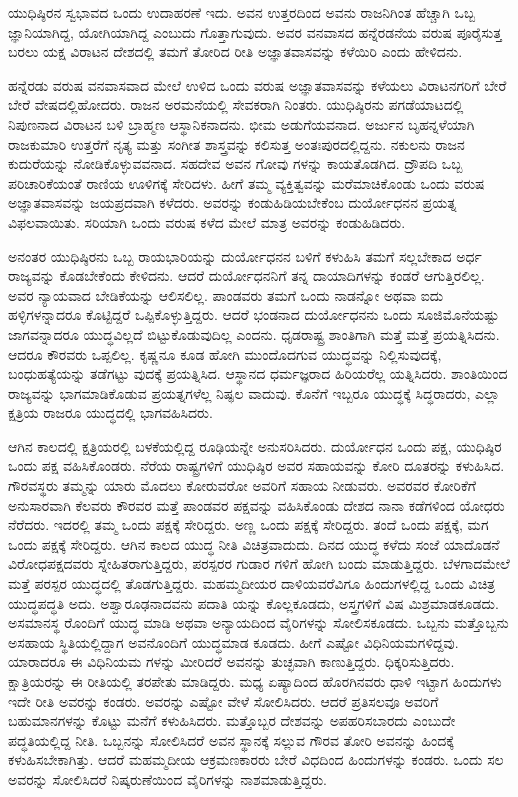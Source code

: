 ಯುಧಿಷ್ಠಿರನ ಸ್ವಭಾವದ ಒಂದು ಉದಾಹರಣೆ ಇದು. ಅವನ ಉತ್ತರದಿಂದ ಅವನು ರಾಜನಿಗಿಂತ ಹೆಚ್ಚಾಗಿ ಒಬ್ಬ ಜ್ಞಾನಿಯಾಗಿದ್ದ, ಯೋಗಿಯಾಗಿದ್ದ ಎಂಬುದು ಗೊತ್ತಾಗುವುದು. ಅವರ ವನವಾಸದ ಹನ್ನೆರಡನೆಯ ವರುಷ ಪೂರೈಸುತ್ತ ಬರಲು ಯಕ್ಷ ವಿರಾಟನ ದೇಶದಲ್ಲಿ ತಮಗೆ ತೋರಿದ ರೀತಿ ಅಜ್ಞಾತವಾಸವನ್ನು ಕಳೆಯಿರಿ ಎಂದು ಹೇಳಿದನು.

ಹನ್ನೆರಡು ವರುಷ ವನವಾಸವಾದ ಮೇಲೆ ಉಳಿದ ಒಂದು ವರುಷ ಅಜ್ಞಾತವಾಸವನ್ನು ಕಳೆಯಲು ವಿರಾಟನಗರಿಗೆ ಬೇರೆ ಬೇರೆ ವೇಷದಲ್ಲಿಹೋದರು. ರಾಜನ ಅರಮನೆಯಲ್ಲಿ ಸೇವಕರಾಗಿ ನಿಂತರು. ಯುಧಿಷ್ಠಿರನು ಪಗಡೆಯಾಟದಲ್ಲಿ ನಿಪುಣನಾದ ವಿರಾಟನ ಬಳಿ ಬ್ರಾಹ್ಮಣ ಆಸ್ಥಾನಿಕನಾದನು. ಭೀಮ ಅಡುಗೆಯವನಾದ. ಅರ್ಜುನ ಬೃಹನ್ನಳೆಯಾಗಿ ರಾಜಕುಮಾರಿ ಉತ್ತರೆಗೆ ನೃತ್ಯ ಮತ್ತು ಸಂಗೀತ ಶಾಸ್ತ್ರವನ್ನು ಕಲಿಸುತ್ತ ಅಂತಃಪುರದಲ್ಲಿದ್ದನು. ನಕುಲನು ರಾಜನ ಕುದುರೆಯನ್ನು ನೋಡಿಕೊಳ್ಳುವವನಾದ. ಸಹದೇವ ಅವನ ಗೋವು ಗಳನ್ನು ಕಾಯತೊಡಗಿದ. ದ್ರೌಪದಿ ಒಬ್ಬ ಪರಿಚಾರಿಕೆಯಂತೆ ರಾಣಿಯ ಊಳಿಗಕ್ಕೆ ಸೇರಿದಳು. ಹೀಗೆ ತಮ್ಮ ವ್ಯಕ್ತಿತ್ವವನ್ನು ಮರೆಮಾಚಿಕೊಂಡು ಒಂದು ವರುಷ ಅಜ್ಞಾತವಾಸವನ್ನು ಜಯಪ್ರದವಾಗಿ ಕಳೆದರು. ಅವರನ್ನು ಕಂಡುಹಿಡಿಯಬೇಕೆಂಬ ದುರ್ಯೋಧನನ ಪ್ರಯತ್ನ ವಿಫಲವಾಯಿತು. ಸರಿಯಾಗಿ ಒಂದು ವರುಷ ಕಳೆದ ಮೇಲೆ ಮಾತ್ರ ಅವರನ್ನು ಕಂಡುಹಿಡಿದರು.

ಅನಂತರ ಯುಧಿಷ್ಠಿರನು ಒಬ್ಬ ರಾಯಭಾರಿಯನ್ನು ದುರ್ಯೋಧನನ ಬಳಿಗೆ ಕಳುಹಿಸಿ ತಮಗೆ ಸಲ್ಲಬೇಕಾದ ಅರ್ಧ ರಾಜ್ಯವನ್ನು ಕೊಡಬೇಕೆಂದು ಕೇಳಿದನು. ಆದರೆ ದುರ್ಯೋಧನನಿಗೆ ತನ್ನ ದಾಯಾದಿಗಳನ್ನು ಕಂಡರೆ ಆಗುತ್ತಿರಲಿಲ್ಲ. ಅವರ ನ್ಯಾಯವಾದ ಬೇಡಿಕೆಯನ್ನು ಆಲಿಸಲಿಲ್ಲ. ಪಾಂಡವರು ತಮಗೆ ಒಂದು ನಾಡನ್ನೋ ಅಥವಾ ಐದು ಹಳ್ಳಿಗಳನ್ನಾದರೂ ಕೊಟ್ಟಿದ್ದರೆ ಒಪ್ಪಿಕೊಳ್ಳುತ್ತಿದ್ದರು. ಆದರೆ ಭಂಡನಾದ ದುರ್ಯೋಧನನು ಒಂದು ಸೂಜಿಮೊನೆಯಷ್ಟು ಜಾಗವನ್ನಾದರೂ ಯುದ್ಧವಿಲ್ಲದೆ ಬಿಟ್ಟುಕೊಡುವುದಿಲ್ಲ ಎಂದನು. ಧೃಡರಾಷ್ಟ್ರ ಶಾಂತಿಗಾಗಿ ಮತ್ತೆ ಮತ್ತೆ ಪ್ರಯತ್ನಿಸಿದನು. ಆದರೂ ಕೌರವರು ಒಪ್ಪಲಿಲ್ಲ. ಕೃಷ್ಣನೂ ಕೂಡ ಹೋಗಿ ಮುಂದೊದಗುವ ಯುದ್ಧವನ್ನು ನಿಲ್ಲಿಸುವುದಕ್ಕೆ, ಬಂಧುಹತ್ಯೆಯನ್ನು ತಡೆಗಟ್ಟು ವುದಕ್ಕೆ ಪ್ರಯತ್ನಿಸಿದ. ಆಸ್ಥಾನದ ಧರ್ಮಜ್ಞರಾದ ಹಿರಿಯರೆಲ್ಲ ಯತ್ನಿಸಿದರು. ಶಾಂತಿಯಿಂದ ರಾಜ್ಯವನ್ನು ಭಾಗಮಾಡಿಕೊಡುವ ಪ್ರಯತ್ನಗಳೆಲ್ಲ ನಿಷ್ಫಲ ವಾದುವು. ಕೊನೆಗೆ ಇಬ್ಬರೂ ಯುದ್ಧಕ್ಕೆ ಸಿದ್ಧರಾದರು, ಎಲ್ಲಾ ಕ್ಷತ್ರಿಯ ರಾಜರೂ ಯುದ್ಧದಲ್ಲಿ ಭಾಗವಹಿಸಿದರು.

ಆಗಿನ ಕಾಲದಲ್ಲಿ ಕ್ಷತ್ರಿಯರಲ್ಲಿ ಬಳಕೆಯಲ್ಲಿದ್ದ ರೂಢಿಯನ್ನೇ ಅನುಸರಿಸಿದರು. ದುರ್ಯೋಧನ ಒಂದು ಪಕ್ಷ, ಯುಧಿಷ್ಠಿರ ಒಂದು ಪಕ್ಷ ವಹಿಸಿಕೊಂಡರು. ನೆರೆಯ ರಾಷ್ಟ್ರಗಳಿಗೆ ಯುಧಿಷ್ಠಿರ ಅವರ ಸಹಾಯವನ್ನು ಕೋರಿ ದೂತರನ್ನು ಕಳುಹಿಸಿದ. ಗೌರವಸ್ಥರು ತಮ್ಮನ್ನು ಯಾರು ಮೊದಲು ಕೋರುವರೋ ಅವರಿಗೆ ಸಹಾಯ ನೀಡುವರು. ಅವರವರ ಕೋರಿಕೆಗೆ ಅನುಸಾರವಾಗಿ ಕೆಲವರು ಕೌರವರ ಮತ್ತೆ ಪಾಂಡವರ ಪಕ್ಷವನ್ನು ವಹಿಸಿಕೊಂಡು ದೇಶದ ನಾನಾ ಕಡೆಗಳಿಂದ ಯೋಧರು ನೆರೆದರು. ಇದರಲ್ಲಿ ತಮ್ಮ ಒಂದು ಪಕ್ಷಕ್ಕೆ ಸೇರಿದ್ದರು. ಅಣ್ಣ ಒಂದು ಪಕ್ಷಕ್ಕೆ ಸೇರಿದ್ದರು. ತಂದೆ ಒಂದು ಪಕ್ಷಕ್ಕೆ, ಮಗ ಒಂದು ಪಕ್ಷಕ್ಕೆ ಸೇರಿದ್ದರು. ಆಗಿನ ಕಾಲದ ಯುದ್ಧ ನೀತಿ ವಿಚಿತ್ರವಾದುದು. ದಿನದ ಯುದ್ಧ ಕಳೆದು ಸಂಜೆ ಯಾದೊಡನೆ ವಿರೋಧಪಕ್ಷದವರು ಸ್ನೇಹಿತರಾಗುತ್ತಿದ್ದರು, ಪರಸ್ಪರರ ಗುಡಾರ ಗಳಿಗೆ ಹೋಗಿ ಬಂದು ಮಾಡುತ್ತಿದ್ದರು. ಬೆಳಗಾದಮೇಲೆ ಮತ್ತೆ ಪರಸ್ಪರ ಯುದ್ಧದಲ್ಲಿ ತೊಡಗುತ್ತಿದ್ದರು. ಮಹಮ್ಮದೀಯರ ದಾಳಿಯವರೆವಿಗೂ ಹಿಂದುಗಳಲ್ಲಿದ್ದ ಒಂದು ವಿಚಿತ್ರ ಯುದ್ಧಪದ್ಧತಿ ಅದು. ಅಶ್ವಾರೂಢನಾದವನು ಪದಾತಿ ಯನ್ನು ಕೊಲ್ಲಕೂಡದು, ಅಸ್ತ್ರಗಳಿಗೆ ವಿಷ ಮಿಶ್ರಮಾಡಕೂಡದು. ಅಸಮಾನಸ್ಥ ರೊಂದಿಗೆ ಯುದ್ಧ ಮಾಡಿ ಅಥವಾ ಅನ್ಯಾಯದಿಂದ ವೈರಿಗಳನ್ನು ಸೋಲಿಸಕೂಡದು. ಒಬ್ಬನು ಮತ್ತೊಬ್ಬನು ಅಸಹಾಯ ಸ್ಥಿತಿಯಲ್ಲಿದ್ದಾಗ ಅವನೊಂದಿಗೆ ಯುದ್ಧಮಾಡ ಕೂಡದು. ಹೀಗೆ ಎಷ್ಟೋ ವಿಧಿನಿಯಮಗಳಿದ್ದವು. ಯಾರಾದರೂ ಈ ವಿಧಿನಿಯಮ ಗಳನ್ನು ಮೀರಿದರೆ ಅವನನ್ನು ತುಚ್ಛವಾಗಿ ಕಾಣುತ್ತಿದ್ದರು. ಧಿಕ್ಕರಿಸುತ್ತಿದರು. ಕ್ಷಾತ್ರಿಯರನ್ನು ಈ ರೀತಿಯಲ್ಲಿ ತರಪೇತು ಮಾಡಿದ್ದರು. ಮಧ್ಯ ಏಷ್ಯಾದಿಂದ ಹೊರಗಿನವರು ಧಾಳಿ ಇಟ್ಟಾಗ ಹಿಂದುಗಳು ಇದೇ ರೀತಿ ಅವರನ್ನು ಕಂಡರು. ಅವರನ್ನು ಎಷ್ಟೋ ವೇಳೆ ಸೋಲಿಸಿದರು. ಆದರೆ ಪ್ರತಿಸಲವೂ ಅವರಿಗೆ ಬಹುಮಾನಗಳನ್ನು ಕೊಟ್ಟು ಮನೆಗೆ ಕಳುಹಿಸಿದರು. ಮತ್ತೊಬ್ಬರ ದೇಶವನ್ನು ಅಪಹರಿಸಬಾರದು ಎಂಬುದೇ ಪದ್ಧತಿಯಲ್ಲಿದ್ದ ನೀತಿ. ಒಬ್ಬನನ್ನು ಸೋಲಿಸಿದರೆ ಅವನ ಸ್ಥಾನಕ್ಕೆ ಸಲ್ಲುವ ಗೌರವ ತೋರಿ ಅವನನ್ನು ಹಿಂದಕ್ಕೆ ಕಳುಹಿಸಬೇಕಾಗಿತ್ತು. ಆದರೆ ಮಹಮ್ಮದೀಯ ಆಕ್ರಮಣಕಾರರು ಬೇರೆ ವಿಧದಿಂದ ಹಿಂದುಗಳನ್ನು ಕಂಡರು. ಒಂದು ಸಲ ಅವರನ್ನು ಸೋಲಿಸಿದರೆ ನಿಷ್ಕರುಣೆಯಿಂದ ವೈರಿಗಳನ್ನು ನಾಶಮಾಡುತ್ತಿದ್ದರು.

